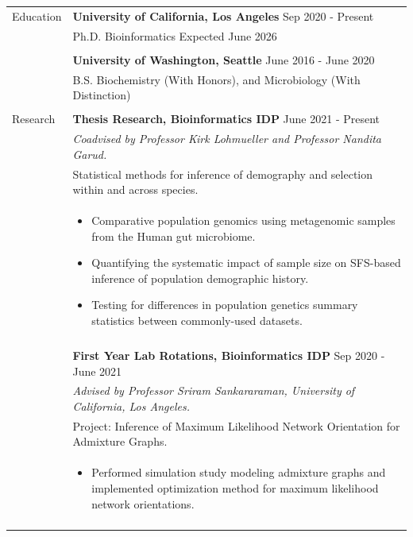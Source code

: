 \documentclass[letterpaper,11pt,oneside]{article}
\begin{document}
\noindent \begin{tabular}{@{} l l}
	\Large{Education}    & \textbf{University of California, Los Angeles} \hfill Sep 2020 - Present \\
		& Ph.D. Bioinformatics \hfill Expected June 2026 \\	
	
\tabularnewline	
	
	& \textbf{University of Washington, Seattle} \hfill June 2016 - June 2020 \\
	& B.S. Biochemistry (With Honors), and Microbiology (With Distinction) \\
\tabularnewline		

	\Large{Research} & \textbf{Thesis Research, Bioinformatics IDP} \hfill June 2021 - Present \\
	& \textit{Coadvised by Professor Kirk Lohmueller and Professor Nandita Garud.} \\
	& Statistical methods for inference of demography and selection within and across species. \\
	& 	\begin{minipage} [t] {0.85 \textwidth} 
     		\begin{itemize} 
     			\itemsep-0.4em 
      			\item Comparative population genomics using metagenomic samples from the Human gut microbiome.
      			\item Quantifying the systematic impact of sample size on SFS-based inference of population demographic history.
      			\item Testing for differences in population genetics summary statistics between commonly-used datasets.
			\end{itemize} 
    	\end{minipage} \\	

\tabularnewline	

	& \textbf{First Year Lab Rotations, Bioinformatics IDP} \hfill Sep 2020 - June 2021 \\
	& \textit{Advised by Professor Sriram Sankararaman, University of California, Los Angeles.} \\
	& Project: Inference of Maximum Likelihood Network Orientation for Admixture Graphs. \\
	& 	\begin{minipage} [t] {0.85 \textwidth} 
     		\begin{itemize} 
     			\itemsep-0.4em 
      			\item Performed simulation study modeling admixture graphs and implemented optimization method for maximum likelihood network orientations.
			\end{itemize} 
    	\end{minipage} \\		
\tabularnewline	
	

\end{tabular}
\end{document}
